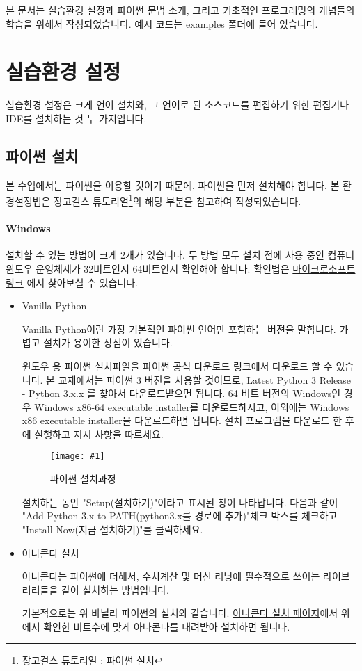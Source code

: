 \documentclass[twoside]{article}
\newcommand\fig[2]{
\begin{figure}[h]
  \centering
  \texttt{[image: \#1]}
  \caption{#2} 
  \label{fig:#1}
\end{figure}
}
\begin{document}
본 문서는 실습환경 설정과 파이썬 문법 소개, 그리고 기초적인 프로그래밍의 개념들의 학습을 위해서  작성되었습니다. 예시 코드는 examples 폴더에 들어 있습니다. 

\section{실습환경 설정} 

실습환경 설정은 크게 언어 설치와, 그 언어로 된 소스코드를 편집하기 위한 편집기나 IDE를 설치하는 것 두 가지입니다. 

\subsection{파이썬 설치} 

본 수업에서는 파이썬을 이용할 것이기 때문에, 파이썬을 먼저 설치해야 합니다. 본 환경설정법은 장고걸스 튜토리얼\footnote{\href{https://tutorial.djangogirls.org/ko/python\_installation/}{장고걸스 튜토리얼 : 파이썬 설치}}의 해당 부분을 참고하여 작성되었습니다. 

\paragraph{Windows} 

설치할 수 있는 방법이 크게 2개가 있습니다. 두 방법 모두 설치 전에 사용 중인 컴퓨터 윈도우 운영체제가 32비트인지 64비트인지 확인해야 합니다. 확인법은 \href{https://support.microsoft.com/ko-kr/help/13443/windows-which-operating-system}{마이크로소프트 링크} 에서 찾아보실 수 있습니다. 

\begin{itemize} 
\item Vanilla Python 

Vanilla Python이란 가장 기본적인 파이썬 언어만 포함하는 버젼을 말합니다. 가볍고 설치가 용이한 장점이 있습니다. 

윈도우 용 파이썬 설치파일을 \href{https://www.python.org/downloads/windows/}{파이썬 공식 다운로드 링크}에서 다운로드 할 수 있습니다. 본 교재에서는 파이썬 3 버젼을 사용할 것이므로, Latest Python 3 Release - Python 3.x.x 를 찾아서 다운로드받으면 됩니다. 64 비트 버전의 Windows인 경우 Windows x86-64 executable installer를 다운로드하시고, 이외에는 Windows x86 executable installer을 다운로드하면 됩니다. 설치 프로그램을 다운로드 한 후에 실행하고 지시 사항을 따르세요. 

\fig{python-install1}{파이썬 설치과정} 

설치하는 동안 "Setup(설치하기)"이라고 표시된 창이 나타납니다. 다음과 같이 "Add Python 3.x to PATH(python3.x를 경로에 추가)"체크 박스를 체크하고 "Install Now(지금 설치하기)"를 클릭하세요.

\item 아나콘다 설치 

아나콘다는 파이썬에 더해서, 수치계산 및 머신 러닝에 필수적으로 쓰이는 라이브러리들을 같이 설치하는 방법입니다. 

기본적으로는 위 바닐라 파이썬의 설치와 같습니다. \href{https://www.anaconda.com/download/}{아나콘다 설치 페이지}에서 위에서 확인한 비트수에 맞게 아나콘다를 내려받아 설치하면 됩니다. 

\end{itemize}
\end{document}
